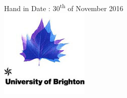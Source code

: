 \begin{titlepage}

{\large Hand in Date : 30\textsuperscript{th} of November 2016}\\[2cm] %


\includegraphics[scale=0.60]{Images/BrightonLogo.jpg}\\[1cm] %




\vfill %

\end{titlepage}
\tableofcontents
\pagebreak




\printbibliography



